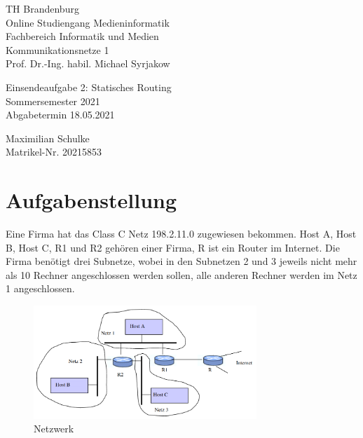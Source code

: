 \documentclass{article}
\begin{document}
\begin{titlepage}
	\begin{flushleft}
		TH Brandenburg \\
		Online Studiengang Medieninformatik \\
		Fachbereich Informatik und Medien \\
		Kommunikationsnetze 1 \\
		Prof. Dr.-Ing. habil. Michael Syrjakow
	\end{flushleft}

	\vfill

	\begin{center}
		\Large{Einsendeaufgabe 2: Statisches Routing}\\[0.5em]
		\large{Sommersemester 2021}\\[0.25em]
		\large{Abgabetermin 18.05.2021}
	\end{center}

	\vfill

	\begin{flushright}
		Maximilian Schulke \\
		Matrikel-Nr. 20215853
	\end{flushright}
\end{titlepage}

\newpage

\section*{Aufgabenstellung}

Eine Firma hat das Class C Netz 198.2.11.0 zugewiesen bekommen. Host A, Host B, Host C, R1 und R2 gehören
einer Firma, R ist ein Router im Internet. Die Firma benötigt drei Subnetze, wobei in den Subnetzen 2 und
3 jeweils nicht mehr als 10 Rechner angeschlossen werden sollen, alle anderen Rechner werden im Netz 1
angeschlossen.

\begin{figure}[ht]
	\includegraphics[width=0.75\textwidth]{plain}
	\centering
	\caption{Netzwerk}
\end{figure}
\end{document}
